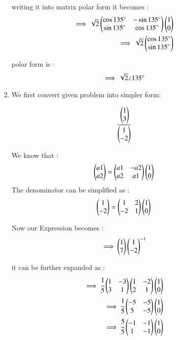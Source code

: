 \begin{enumerate}[label=\thesection.\arabic*.,ref=\thesection.\theenumi]
\begin{enumerate}
writing it into matrix polar form it becomes :
\begin{align}
    \implies \sqrt{2}\begin{pmatrix}\cos{135}\degree & -\sin{135}\degree\\ \sin{135}\degree & \cos{135}\degree\end{pmatrix}\begin{pmatrix}1 \\ 0\end{pmatrix}
\\
    \implies \sqrt{2}\begin{pmatrix}\cos{135}\degree \\ \sin{135}\degree\end{pmatrix}
\end{align}

polar form is :
\begin{align}
    \implies \sqrt{2} \angle 135 \degree
\end{align}



\item We first convert given problem into simpler form:

\begin{align}
    \cfrac{\begin{pmatrix}1 \\ 3\end{pmatrix}}{\begin{pmatrix}1 \\ -2\end{pmatrix}}
\end{align} 

We know that :
\begin{align}
    \begin{pmatrix}a1 \\ a2\end{pmatrix} = \begin{pmatrix}a1 & -a2\\a2 & a1\end{pmatrix}\begin{pmatrix}1 \\ 0\end{pmatrix}
\end{align}
The denominator can be simplified as :
\begin{align}
    \begin{pmatrix}1 \\ -2\end{pmatrix} = \begin{pmatrix}1 & 2\\-2 & 1\end{pmatrix}\begin{pmatrix}1 \\ 0\end{pmatrix}
\end{align}

Now our Expression becomes :
\begin{align}
    \implies \begin{pmatrix}1 \\ 7\end{pmatrix}\begin{pmatrix}1\\-2\end{pmatrix}^{-1}
\end{align}

it can be further expanded as :
\begin{align}
    \implies \cfrac{1}{5}\begin{pmatrix}1 & -3\\3 & 1\end{pmatrix}\begin{pmatrix}1 & -2\\2 & 1\end{pmatrix}\begin{pmatrix}1 \\ 0\end{pmatrix}
\\
    \implies \cfrac{1}{5}\begin{pmatrix}-5 & -5\\5 & -5\end{pmatrix}\begin{pmatrix}1 \\ 0\end{pmatrix}
\\
    \implies \cfrac{5}{5}\begin{pmatrix}-1 & -1\\1 & -1\end{pmatrix}\begin{pmatrix}1 \\ 0\end{pmatrix}
\end{align}


\end{enumerate}
\end{enumerate}
